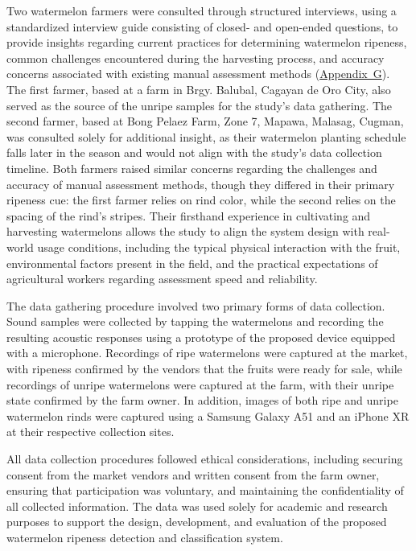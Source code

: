 \begin{thesisprose}
Two watermelon farmers were consulted through structured interviews, using a standardized interview guide consisting of closed- and open-ended questions, to provide insights regarding current practices for determining watermelon ripeness, common challenges encountered during the harvesting process, and accuracy concerns associated with existing manual assessment methods (\hyperref[app:section-G]{Appendix~G}). The first farmer, based at a farm in Brgy. Balubal, Cagayan de Oro City, also served as the source of the unripe samples for the study's data gathering. The second farmer, based at Bong Pelaez Farm, Zone 7, Mapawa, Malasag, Cugman, was consulted solely for additional insight, as their watermelon planting schedule falls later in the season and would not align with the study's data collection timeline. Both farmers raised similar concerns regarding the challenges and accuracy of manual assessment methods, though they differed in their primary ripeness cue: the first farmer relies on rind color, while the second relies on the spacing of the rind's stripes. Their firsthand experience in cultivating and harvesting watermelons allows the study to align the system design with real-world usage conditions, including the typical physical interaction with the fruit, environmental factors present in the field, and the practical expectations of agricultural workers regarding assessment speed and reliability.

The data gathering procedure involved two primary forms of data collection. Sound samples were collected by tapping the watermelons and recording the resulting acoustic responses using a prototype of the proposed device equipped with a microphone. Recordings of ripe watermelons were captured at the market, with ripeness confirmed by the vendors that the fruits were ready for sale, while recordings of unripe watermelons were captured at the farm, with their unripe state confirmed by the farm owner. In addition, images of both ripe and unripe watermelon rinds were captured using a Samsung Galaxy A51 and an iPhone XR at their respective collection sites.

All data collection procedures followed ethical considerations, including securing consent from the market vendors and written consent from the farm owner, ensuring that participation was voluntary, and maintaining the confidentiality of all collected information. The data was used solely for academic and research purposes to support the design, development, and evaluation of the proposed watermelon ripeness detection and classification system.


\end{thesisprose}
